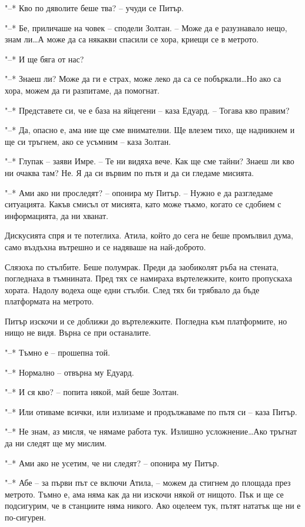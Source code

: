 \documentclass[ebook,openany,12pt]{memoir}
\begin{document}
"--* Кво по дяволите беше тва? – учуди се Питър.

"--* Бе, приличаше на човек – сподели Золтан. – Може да е разузнавало нещо, знам ли\ldots А може да са някакви спасили се хора, криещи се в метрото.

"--* И ще бяга от нас? 

"--* Знаеш ли? Може да ги е страх, може леко да са се побъркали\ldots Но ако са хора, можем да ги разпитаме, да помогнат.

"--* Представете си, че е база на яйцегени – каза Едуард. – Тогава кво правим?

"--* Да, опасно е, ама ние ще сме внимателни. Ще влезем тихо, ще надникнем и ще си тръгнем, ако се усъмним – каза Золтан.

"--* Глупак – заяви Имре. – Те ни видяха вече. Как ще сме тайни? Знаеш ли кво ни очаква там? Не. Я да си вървим по пътя и да си гледаме мисията.

"--* Ами ако ни проследят? – опонира му Питър. -- Нужно е да разгледаме ситуацията. Какъв смисъл от мисията, като може тъкмо, когато се сдобием с информацията, да ни хванат.

Дискусията спря и те потеглиха. Атила, който до сега не беше промълвил дума, само въздъхна вътрешно и се надяваше на най-доброто.

Слязоха по стълбите. Беше полумрак. Преди да заобиколят ръба на стената, погледнаха в тъмнината. Пред тях се намираха въртележките, които пропускаха хората. Надолу водеха още едни стълби. След тях би трябвало да бъде платформата на метрото.

Питър изскочи и се доближи до въртележките. Погледна към платформите, но нищо не видя. Върна се при останалите.

"--* Тъмно е – прошепна той.

"--* Нормално – отвърна му Едуард.

"--* И ся кво? – попита някой, май беше Золтан.

"--* Или отиваме всички, или излизаме и продължаваме по пътя си – каза Питър.

"--* Не знам, аз мисля, че нямаме работа тук. Излишно усложнение\ldots Ако тръгнат да ни следят ще му мислим.

"--* Ами ако не усетим, че ни следят? – опонира му Питър.

"--* Абе -- за първи път се включи Атила, – можем да стигнем до площада през метрото. Тъмно е, ама няма как да ни изскочи някой от нищото. Пък и ще се подсигурим, че в станциите няма никого. Ако оцелеем тук, пътят нататък ще ни е по-сигурен.
\end{document}
